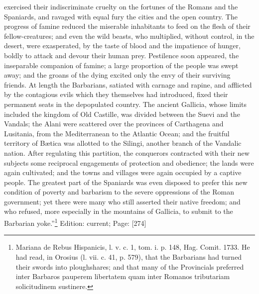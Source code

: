 exercised their indiscriminate cruelty on the fortunes of the Romans and the Spaniards, and ravaged with equal fury the cities and the open country. The progress of famine reduced the miserable inhabitants to feed on the flesh of their fellow-creatures; and even the wild beasts, who multiplied, without control, in the desert, were exasperated, by the taste of blood and the impatience of hunger, boldly to attack and devour their human prey. Pestilence soon appeared, the inseparable companion of famine; a large proportion of the people was swept away; and the groans of the dying excited only the envy of their surviving friends. At length the Barbarians, satiated with carnage and rapine, and afflicted by the contagious evils which they themselves had introduced, fixed their permanent seats in the depopulated country. The ancient Gallicia, whose limits included the kingdom of Old Castille, was divided between the Suevi and the Vandals; the Alani were scattered over the provinces of Carthagena and Lusitania, from the Mediterranean to the Atlantic Ocean; and the fruitful territory of Bætica was allotted to the Silingi, another branch of the Vandalic nation. After regulating this partition, the conquerors contracted with their new subjects some reciprocal engagements of protection and obedience; the lands were again cultivated; and the towns and villages were again occupied by a captive people. The greatest part of the Spaniards was even disposed to prefer this new condition of poverty and barbarism to the severe oppressions of the Roman government; yet there were many who still asserted their native freedom; and who refused, more especially in the mountains of Gallicia, to submit to the Barbarian yoke.\texthebrew{}”\footnote{Mariana de Rebus Hispanicis, l. v. c. 1, tom. i. p. 148, Hag. Comit. 1733. He had read, in Orosius (l. vii. c. 41, p. 579), that the Barbarians had turned their swords into ploughshares; and that many of the Provincials preferred inter Barbaros pauperem libertatem quam inter Romanos tributariam solicitudinem sustinere.}
Edition: current; Page: [274]

